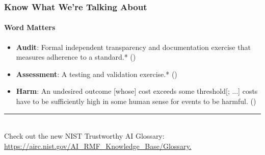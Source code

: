 \documentclass[11pt,
               aspectratio=169,
               hyperref={colorlinks}
               ]{beamer}
\begin{document}
		\begin{frame}
	
			\frametitle{Know What We're Talking About}
			\framesubtitle{Word Matters}
			
			\begin{itemize}
				\item \textbf{Audit}: Formal independent transparency and documentation exercise that measures adherence to a standard.* (\cite{hasan2022algorithmic})
				
				\item \textbf{Assessment}: A testing and validation exercise.* (\cite{hasan2022algorithmic})
				
				\item \textbf{Harm}: An undesired outcome [whose] cost exceeds some threshold[; ...] costs have to be sufficiently high in some human sense for events to be harmful. (\cite{atherton2023language})		
			\end{itemize}
					
			\vspace{10pt}
			\par\noindent\rule{100pt}{0.4pt}\\
			\vspace{5pt}
			\scriptsize{Check out the new NIST Trustworthy AI Glossary: \url{https://airc.nist.gov/AI_RMF_Knowledge_Base/Glossary.}}

		\end{frame}
		
\end{document}
